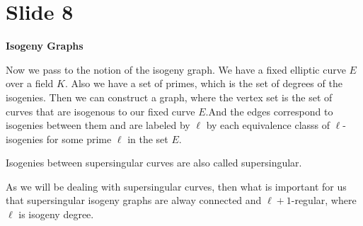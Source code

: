 \documentclass[10 pt]{article}
\begin{document}
\section{Slide 8} \large{\textbf{Isogeny Graphs}}

Now we pass to the notion of the isogeny graph. We have a fixed elliptic curve $E$ over a field $K$. Also we have a set of primes, which is the set of degrees of the isogenies. Then we can construct a graph, where the vertex set is the set of curves that are isogenous to our fixed curve $E$.And the edges correspond to isogenies between them and are labeled by $\ell$ by each equivalence classs of $\ell$-isogenies for some prime $\ell$ in the set $E$.

Isogenies between supersingular curves are also called supersingular.

As we will be dealing with supersingular curves, then what is important for us that supersingular isogeny graphs are alway connected and $\ell + 1$-regular, where $\ell$ is isogeny degree.
\end{document}
